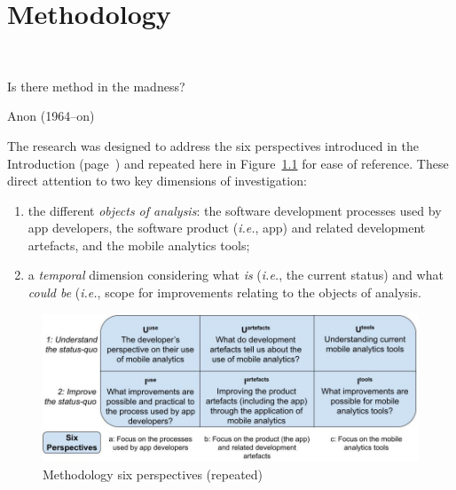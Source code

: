 \setchapterpreamble[u]{\margintoc}
\chapter{Methodology}~\label{chapter-methodology}

\epigraph{Is there method in the madness?}{Anon (1964--on)}

The research was designed to address the six perspectives introduced in the Introduction (page~\pageref{rq-leads-to-six-perspectives}) and repeated here in Figure~\ref{fig:six-perspectives-in-the-methodology} for ease of reference.  These direct attention to two key dimensions of investigation:
\begin{enumerate}
    \item the different \emph{objects of analysis}: the software development processes used by app developers, the software product (\emph{i.e.}, app) and related development artefacts, and the mobile analytics tools; 
    
    \item a \emph{temporal} dimension considering what \emph{is} (\emph{i.e.}, the current status) and what \emph{could be} (\emph{i.e.}, scope for improvements relating to the objects of analysis.
\end{enumerate}

\begin{figure}
    \centering
    \includegraphics[width=\linewidth]{images/my/six-perspectives-2x3-matrix-12-nov-2021.jpeg}
    \caption{Methodology six perspectives (repeated)}
    \label{fig:six-perspectives-in-the-methodology}
\end{figure}

